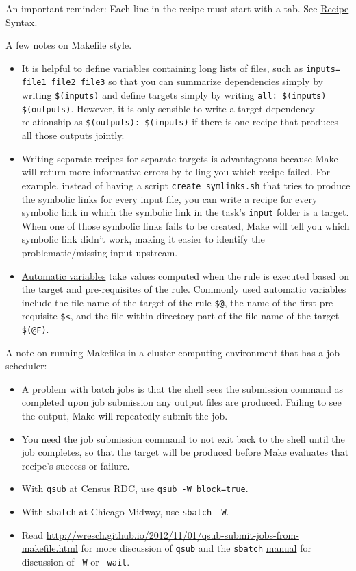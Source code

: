 An important reminder: Each line in the recipe must start with a tab.
See \href{https://www.gnu.org/software/make/manual/html_node/Recipe-Syntax.html}{Recipe Syntax}.

A few notes on Makefile style.
\begin{itemize}
\item It is helpful to define \href{https://www.gnu.org/software/make/manual/html_node/Variables-Simplify.html#Variables-Simplify}{variables} containing long lists of files, such as \texttt{inputs= file1 file2 file3}
so that you can summarize dependencies simply by writing \texttt{\$(inputs)}
and define targets simply by writing \texttt{all: \$(inputs) \$(outputs)}.
However, it is only sensible to write a target-dependency relationship as
\texttt{\$(outputs): \$(inputs)}
if there is one recipe that produces all those outputs jointly.
\item Writing separate recipes for separate targets is advantageous because Make will return more informative errors by telling you which recipe failed.
For example, instead of having a script \texttt{create\_symlinks.sh} that tries to produce the symbolic links for every input file,
you can write a recipe for every symbolic link in which the symbolic link in the task's \texttt{input} folder is a target.
When one of those symbolic links fails to be created, Make will tell you which symbolic link didn't work, making it easier to identify the problematic/missing input upstream.
\item \href{https://www.gnu.org/software/make/manual/html_node/Automatic-Variables.html}{Automatic variables} take values computed when the rule is executed based on the target and pre-requisites of the rule. 
Commonly used automatic variables include 
the file name of the target of the rule \texttt{\$@},
the name of the first pre-requisite \texttt{\$<},
and
the file-within-directory part of the file name of the target \texttt{\$(@F)}.

\end{itemize}

A note on running Makefiles in a cluster computing environment that has a job scheduler:
\begin{itemize}
	\item A problem with batch jobs is that the shell sees the submission command as completed upon job submission any output files are produced.
	Failing to see the output, Make will repeatedly submit the job.
	\item You need the job submission command to not exit back to the shell until the job completes, so that the target will be produced before Make evaluates that recipe's success or failure.
	\item With \texttt{qsub} at Census RDC, use \texttt{qsub -W block=true}.
	\item With \texttt{sbatch} at Chicago Midway, use \texttt{sbatch -W}.
	\item Read \url{http://wresch.github.io/2012/11/01/qsub-submit-jobs-from-makefile.html} for more discussion of \texttt{qsub} and the \texttt{sbatch} \href{https://slurm.schedmd.com/sbatch.html}{manual} for discussion of \texttt{-W} or \texttt{--wait}. 
\end{itemize}

